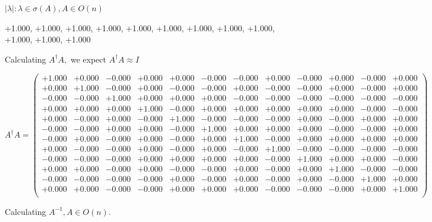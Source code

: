 \documentclass[9pt]{article}
\theoremstyle{plain}
\theoremstyle{definition}
\theoremstyle{remark}
\numberwithin{equation}{section}
\begin{document}
 $|\lambda | : \lambda \in \sigma(A) , A \in O(n)$

+1.000, +1.000, +1.000, +1.000, +1.000, +1.000, +1.000, +1.000, +1.000, +1.000, +1.000, +1.000


Calculating $A^{\dag} A,$  we expect $A^{\dag} A \approx I$

$A^{\dag} A = \left(
\begin{array}{
cccccccccccc}
+1.000 & +0.000 & -0.000 & +0.000 & +0.000 & -0.000 & -0.000 & +0.000 & -0.000 & +0.000 & -0.000 & +0.000 \\
+0.000 & +1.000 & -0.000 & +0.000 & -0.000 & -0.000 & +0.000 & -0.000 & -0.000 & +0.000 & -0.000 & +0.000 \\
-0.000 & -0.000 & +1.000 & +0.000 & +0.000 & +0.000 & -0.000 & -0.000 & -0.000 & -0.000 & -0.000 & -0.000 \\
+0.000 & +0.000 & +0.000 & +1.000 & -0.000 & +0.000 & +0.000 & +0.000 & +0.000 & +0.000 & -0.000 & -0.000 \\
+0.000 & -0.000 & +0.000 & -0.000 & +1.000 & -0.000 & -0.000 & -0.000 & +0.000 & -0.000 & +0.000 & +0.000 \\
-0.000 & -0.000 & +0.000 & +0.000 & -0.000 & +1.000 & +0.000 & +0.000 & +0.000 & -0.000 & -0.000 & +0.000 \\
-0.000 & +0.000 & -0.000 & +0.000 & -0.000 & +0.000 & +1.000 & -0.000 & +0.000 & +0.000 & +0.000 & +0.000 \\
+0.000 & -0.000 & -0.000 & +0.000 & -0.000 & +0.000 & -0.000 & +1.000 & -0.000 & -0.000 & -0.000 & -0.000 \\
-0.000 & -0.000 & -0.000 & +0.000 & +0.000 & +0.000 & +0.000 & -0.000 & +1.000 & +0.000 & +0.000 & -0.000 \\
+0.000 & +0.000 & -0.000 & +0.000 & -0.000 & -0.000 & +0.000 & -0.000 & +0.000 & +1.000 & -0.000 & -0.000 \\
-0.000 & -0.000 & -0.000 & -0.000 & +0.000 & -0.000 & +0.000 & -0.000 & +0.000 & -0.000 & +1.000 & +0.000 \\
+0.000 & +0.000 & -0.000 & -0.000 & +0.000 & +0.000 & +0.000 & -0.000 & -0.000 & -0.000 & +0.000 & +1.000 \\
\end{array}
\right)$ \newline 

Calculating $A^{-1} ,  A \in O(n)$.
\end{document}
